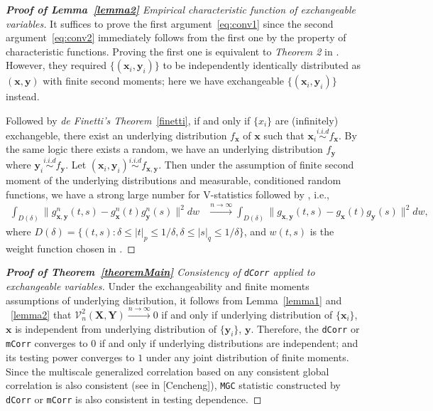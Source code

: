 \documentclass[12pt]{article}
\theoremstyle{definition}
\begin{document}
\begin{proof}[\textbf{Proof of Lemma~\ref{lemma2}} Empirical characteristic function of exchangeable variables] 
\bigskip	
It suffices to prove the first argument~\ref{eq:conv1} since the second argument~\ref{eq:conv2} immediately follows from the first one by the property of characteristic functions.
Proving the first one is equivalent to \textit{Theorem 2} in \cite{szekely2007measuring}. However, they required $\{(\mathbf{x}_{i},\mathbf{y}_{i})\}$ to be independently identically distributed as $(\mathbf{x},\mathbf{y})$ with finite second moments; here we have exchangeable $\{ ( \mathbf{x}_{i}, \mathbf{y}_{i}  ) \}$ instead. 

Followed by \textit{de Finetti's Theorem}~\ref{finetti}, if and only if $\{ x_{i} \}$ are (infinitely) exchangeble, there exist an underlying distribution $f_{\mathbf{x}}$ of $\mathbf{x}$ such that $\mathbf{x}_{i}  \overset{i.i.d}{\sim} f_{\mathbf{x}} $. By the same logic there exists a random, we have an underlying distribution $f_{\mathbf{y}}$ where $\mathbf{y}_{i} \overset{i.i.d}{\sim} f_{\mathbf{y}}$. Let $(\mathbf{x}_{i}, \mathbf{y}_{i}) \overset{i.i.d}{\sim}   f_{\mathbf{x}, \mathbf{y}}$. Then under the assumption of finite second moment of the underlying distributions and measurable, conditioned random functions, we have a strong large number for V-statistics followed by \cite{szekely2007measuring}, i.e., 
\begin{eqnarray}
		\displaystyle\int_{D(\delta)}{\|g_{\mathbf{x},\mathbf{y}}^{n}(t,s)-g_{\mathbf{x}}^{n}(t)g_{\mathbf{y}}^{n}(s)\|^{2}}dw &\stackrel{n \rightarrow \infty}{\longrightarrow} 
		 \displaystyle\int_{D(\delta)}{\|g_{\mathbf{x},\mathbf{y}}(t,s)-g_{\mathbf{x}}(t)g_{\mathbf{y}}(s)\|^{2}}dw,
\label{eq:SLLN}
\end{eqnarray}
where $D(\delta)=\{(t,s):\delta \leq |t|_{p} \leq 1/\delta,\delta \leq |s|_{q} \leq 1/\delta\}$, and $w(t,s)$ is the weight function chosen in \cite{szekely2007measuring}. 
\end{proof}

\begin{proof}[\textbf{Proof of Theorem~\ref{theoremMain}} Consistency of \texttt{dCorr} applied to exchangeable variables]
\bigskip
Under the exchangeability and finite moments assumptions of underlying distribution, it follows from Lemma~\ref{lemma1} and ~\ref{lemma2} that $\mathcal{V}^{2}_{n}(\mathbf{X},\mathbf{Y}) \xrightarrow{n \rightarrow \infty}  0$ if and only if underlying distribution of $\{\mathbf{x}_{i} \}$, $\mathbf{x}$ is independent from underlying distribution of $\{ \mathbf{y}_{i}  \}$, $\mathbf{y}$. Therefore, the \texttt{dCorr} or \texttt{mCorr} converges to $0$ if and only if  underlying distributions are independent; and its testing power converges to $1$ under any joint distribution of finite moments. Since the multiscale generalized correlation based on any consistent global correlation is also consistent (see in [Cencheng]), \texttt{MGC} statistic constructed by \texttt{dCorr} or \texttt{mCorr} is also consistent in testing dependence.
\end{proof}
\end{document}
